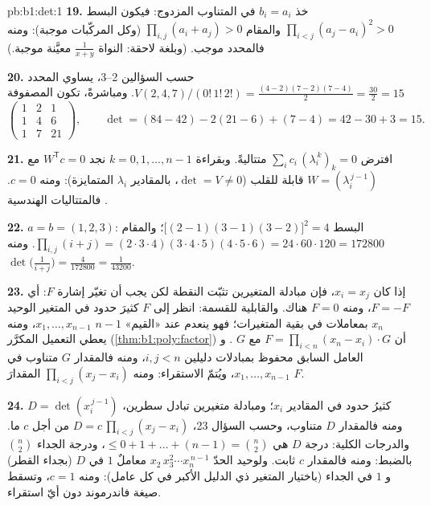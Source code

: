 \begin{solution}{pb:b1:det:1}
\textbf{19.} خذ $b_i = a_i$ في المتناوب المزدوج: فيكون
البسط $\prod_{i<j}(a_j - a_i)^2 > 0$ والمقام
$\prod_{i,j}(a_i + a_j) > 0$ (وكل المركّبات موجبة): ومنه
فالمحدد موجب. (وبلغة لاحقة: النواة
$\frac1{x+y}$ معيَّنة موجبة.)

\textbf{20.} حسب السؤالين 2--3، يساوي المحدد
$V(2,4,7)/(0!\,1!\,2!) = \frac{(4-2)(7-2)(7-4)}{2} =
\frac{30}{2} = 15$. ومباشرةً، تكون المصفوفة
\[
\begin{pmatrix}
1 & 2 & 1\\
1 & 4 & 6\\
1 & 7 & 21
\end{pmatrix},
\qquad
\det = (84 - 42) - 2(21 - 6) + (7 - 4) = 42 - 30 + 3 = 15 .
\]

\textbf{21.} افترض $\sum_i c_i\,(\lambda_i^{\,k})_{k} = 0$
متتاليةً. وبقراءة $k = 0, 1, \dots, n-1$ نجد $W^{\mathsf
T}c = 0$ مع $W = (\lambda_i^{\,j-1})$ قابلة للقلب ($\det = V
\neq 0$، بالمقادير $\lambda_i$ المتمايزة): ومنه $c = 0$. فالمتتاليات الهندسية
.

\textbf{22.} $a = b = (1, 2, 3)$: البسط $\bigl[(2-1)(3-1)
(3-2)\bigr]^2 = 4$؛ والمقام $\prod_{i,j}(i + j) =
(2\cdot3\cdot4)(3\cdot4\cdot5)(4\cdot5\cdot6) = 24\cdot60\cdot120
= 172800$. ومنه $\det\bigl(\frac1{i+j}\bigr) = \frac{4}{172800}
= \frac1{43200}$.

\textbf{23.} إذا كان $x_i = x_j$، فإن مبادلة المتغيرين تثبّت
النقطة لكن يجب أن تغيّر إشارة $F$: أي $F = -F$، ومنه $F = 0$
هناك. والقابلية للقسمة: انظر إلى $F$ كثيرَ حدود في المتغير
الوحيد $x_n$ بمعاملات في بقية المتغيرات؛ فهو
ينعدم عند «القيم» $n - 1$ $x_1, \dots, x_{n-1}$، ومنه
يعطي التعميل المكرَّر (\cref{thm:b1:poly:factor}) أن $F =
\prod_{i<n}(x_n - x_i)\cdot G$ مع $G$ . و
العامل السابق محفوظ بمبادلات دليلين $i, j < n$، ومنه
فالمقدار $G$ متناوب في $x_1, \dots, x_{n-1}$، ويُتمّ الاستقراء:
ومنه  $\prod_{i<j}(x_j - x_i)$ المقدارَ $F$.

\textbf{24.} $D = \det(x_i^{\,j-1})$ كثيرُ حدود في
المقادير $x_i$؛ ومبادلة متغيرين تبادل سطرين، ومنه فالمقدار $D$
متناوب، وحسب السؤال 23، $D = c\,\prod_{i<j}(x_j - x_i)$
من أجل  $c$ ما. والدرجات الكلية: درجة $D$ هي $\leq 0 +
1 + \dots + (n-1) = \binom n2$، ودرجة الجداء $\binom n2$ بالضبط:
ومنه فالمقدار $c$ ثابت. ولوحيد الحدّ $x_2\,x_3^2\cdots
x_n^{\,n-1}$ معاملٌ $1$ في $D$ (بجداء القطر) و
$1$ في الجداء (باختيار المتغير ذي الدليل الأكبر في كل
عامل): ومنه $c = 1$، وتسقط صيغة فاندرموند دون أيّ
استقراء.


\end{solution}

